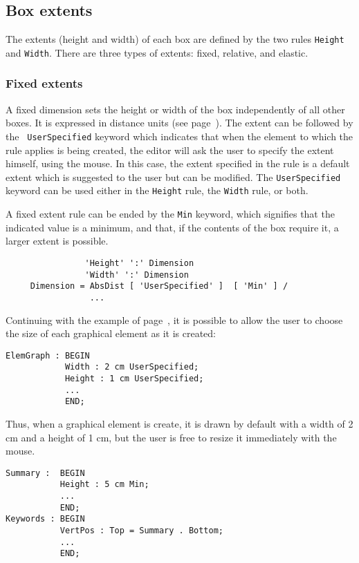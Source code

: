 \subsection{Box extents}
\label{dimension}

The extents (height and width) of each box are defined by the two
rules {\tt Height} and {\tt Width}.  There are three types of extents:
fixed, relative, and elastic.

\subsubsection{Fixed extents}

A fixed dimension sets the height or width of the box independently of
all other boxes.  It is expressed in distance units (see
page~\pageref{unites}).  The extent can be followed by the {\tt
UserSpecified} keyword which indicates that when the element to which
the rule applies is being created, the editor will ask the user to
specify the extent himself, using the mouse.  In this case, the extent
specified in the rule is a default extent which is suggested to the
user but can be modified.  The {\tt UserSpecified} keyword can be used
either in the {\tt Height} rule, the {\tt Width} rule, or both.

A fixed extent rule can be ended by the {\tt Min} keyword, which
signifies that the indicated value is a minimum, and that, if the
contents of the box require it, a larger extent is possible.

\begin{verbatim}
                'Height' ':' Dimension
                'Width' ':' Dimension
     Dimension = AbsDist [ 'UserSpecified' ]  [ 'Min' ] /
                 ...
\end{verbatim}

\begin{example}
Continuing with the example of  page~\pageref{expos2}, it is possible
to allow the user to choose the size of each graphical element as it
is created:

\begin{verbatim}
ElemGraph : BEGIN
            Width : 2 cm UserSpecified;
            Height : 1 cm UserSpecified;
            ...
            END;
\end{verbatim}

Thus, when a graphical element is create, it is drawn by default with
a width of 2 cm and a height of 1 cm, but the user is free to resize
it immediately with the mouse.

\begin{verbatim}
Summary :  BEGIN
           Height : 5 cm Min;
           ...
           END;
Keywords : BEGIN
           VertPos : Top = Summary . Bottom;
           ...
           END;
\end{verbatim}
\end{example}

